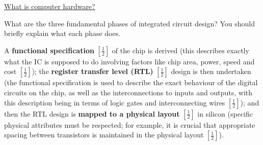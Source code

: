 \documentclass{exam}
\begin{document}
\begin{center}
	\underline{\huge What is computer hardware?}
\end{center}
\begin{questions}
\question[3] What are the three fundamental phases of integrated circuit design?
You should briefly explain what each phase does. 

\begin{solution}[.2in]
A \textbf{functional specification} $[\frac{1}{2}]$ of the chip is derived (this describes
exactly what the IC is supposed to do involving factors like chip area,
power, speed and cost $[\frac{1}{2}]$); the \textbf{register transfer level (RTL)} $[\frac{1}{2}]$ design
is then undertaken (the functional specification is used to describe
the exact behaviour of the digital circuits on the chip, as well as the
interconnections to inputs and outputs, with this description being in
terms of logic gates and interconnecting wires $[\frac{1}{2}]$); and then the RTL
design is \textbf{mapped to a physical layout} $[\frac{1}{2}]$ in silicon (specific physical
attributes must be respected; for example, it is crucial that appropriate
spacing between transistors is maintained in the physical layout $[\frac{1}{2}]$).
\end{solution}


\end{questions}
\end{document}

